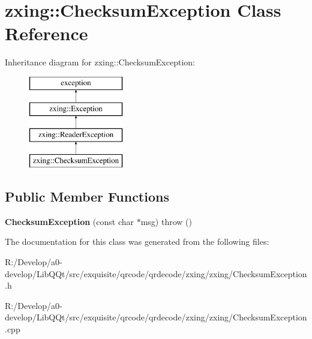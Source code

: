 \hypertarget{classzxing_1_1_checksum_exception}{}\section{zxing\+:\+:Checksum\+Exception Class Reference}
\label{classzxing_1_1_checksum_exception}
Inheritance diagram for zxing\+:\+:Checksum\+Exception\+:\begin{figure}[H]
\begin{center}
\leavevmode
\includegraphics[height=4.000000cm]{classzxing_1_1_checksum_exception}
\end{center}
\end{figure}
\subsection*{Public Member Functions}
\begin{DoxyCompactItemize}
\item 
\mbox{\label{classzxing_1_1_checksum_exception_aa1a8049e32489efa4b1f44e73f04d089}} 
{\bfseries Checksum\+Exception} (const char $\ast$msg)  throw ()
\end{DoxyCompactItemize}


The documentation for this class was generated from the following files\+:\begin{DoxyCompactItemize}
\item 
R\+:/\+Develop/a0-\/develop/\+Lib\+Q\+Qt/src/exquisite/qrcode/qrdecode/zxing/zxing/Checksum\+Exception.\+h\item 
R\+:/\+Develop/a0-\/develop/\+Lib\+Q\+Qt/src/exquisite/qrcode/qrdecode/zxing/zxing/Checksum\+Exception.\+cpp\end{DoxyCompactItemize}
